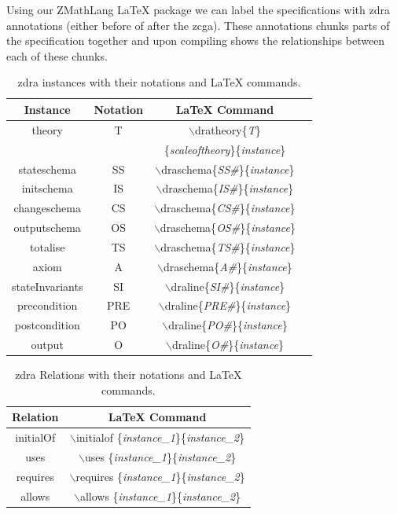 Using our ZMathLang \LaTeX{} package we can label the specifications with \gls{zdra} annotations (either before of after the \gls{zcga}). These annotations chunks parts of the specification together and upon compiling shows the relationships between each of these chunks.

\begin{table}[H]
\begin{tabular}{| c | c | c | c |}
\hline
\textbf{Instance} & \textbf{Notation} & \textbf{\LaTeX{} Command}  \\
\hline
theory & T & $\backslash$dratheory\{\textit{T}\}\\
& & \{\textit{scaleoftheory}\}\{\textit{instance}\}  \\
\hline
stateschema & SS & $\backslash$draschema\{\textit{SS\#}\}\{\textit{instance}\}  \\
\hline
initschema & IS & $\backslash$draschema\{\textit{IS\#}\}\{\textit{instance}\}  \\
\hline
changeschema & CS & $\backslash$draschema\{\textit{CS\#}\}\{\textit{instance}\}  \\
\hline
outputschema & OS & $\backslash$draschema\{\textit{OS\#}\}\{\textit{instance}\}  \\
\hline
totalise & TS & $\backslash$draschema\{\textit{TS\#}\}\{\textit{instance}\}  \\
\hline
axiom & A  & $\backslash$draschema\{\textit{A\#}\}\{\textit{instance}\}  \\
\hline
stateInvariants & SI & $\backslash$draline\{\textit{SI\#}\}\{\textit{instance}\}  \\
\hline
precondition & PRE & $\backslash$draline\{\textit{PRE\#}\}\{\textit{instance}\}  \\
\hline
postcondition & PO  & $\backslash$draline\{\textit{PO\#}\}\{\textit{instance}\}  \\
\hline
output & O  & $\backslash$draline\{\textit{O\#}\}\{\textit{instance}\}  \\
\hline
\end{tabular}
\caption{\label{tab:instances} \gls{zdra} instances with their notations and \LaTeX{} commands.}
\end{table}

\begin{table}[H]
\begin{tabular}{| c | c |}
\hline
\textbf{Relation} &  \textbf{\LaTeX{} Command} \\
\hline
initialOf &  $\backslash$initialof \{\textit{instance\_1}\}\{\textit{instance\_2}\}  \\
\hline
uses & $\backslash$uses \{\textit{instance\_1}\}\{\textit{instance\_2}\}\\
\hline
requires & $\backslash$requires \{\textit{instance\_1}\}\{\textit{instance\_2}\}\\
\hline
allows & $\backslash$allows \{\textit{instance\_1}\}\{\textit{instance\_2}\}\\
\hline
\end{tabular}
\caption{\label{tab:relations} \gls{zdra} Relations with their notations and \LaTeX{} commands.}
\end{table}

